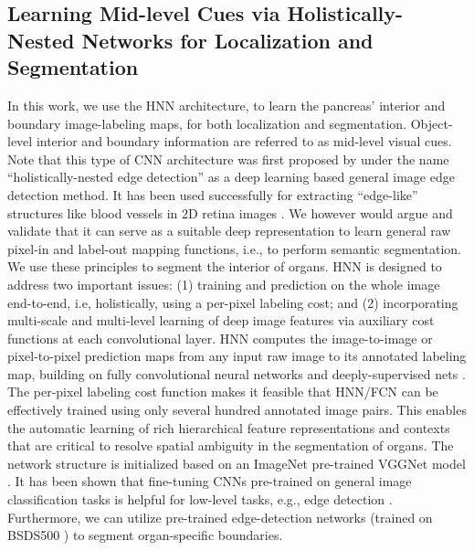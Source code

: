 \documentclass[journal]{IEEEtran}
\begin{document}
\subsection{Learning Mid-level Cues via Holistically-Nested Networks for Localization and Segmentation} \label{sec:segHNN} 
\noindent In this work, we use the HNN architecture, to learn the pancreas' interior and boundary image-labeling maps, for both localization and segmentation. Object-level interior and boundary information are referred to as mid-level visual cues. Note that this type of CNN architecture was first proposed by \cite{xie2015holistically} under the name ``holistically-nested edge detection'' as a deep learning based general image edge detection method. %
It has been used successfully for extracting ``edge-like'' structures like blood vessels in 2D retina images \cite{fu2016retinal}. We however would argue and validate that it can serve as a suitable deep representation to learn general raw pixel-in and label-out mapping functions, i.e., to perform semantic segmentation. We use these principles to segment the interior of organs. 
HNN is designed to address two important issues: (1) training and prediction on the whole image end-to-end, i.e, holistically, using a per-pixel labeling cost; and (2) incorporating multi-scale and multi-level learning of deep image features \cite{xie2015holistically} via auxiliary cost functions at each convolutional layer. HNN computes the image-to-image or pixel-to-pixel prediction maps from any input raw image to its annotated labeling map, building on fully convolutional neural networks \cite{long2015fully} and deeply-supervised nets \cite{lee2014deeply}. The per-pixel labeling cost function \cite{long2015fully,xie2015holistically} makes it feasible that HNN/FCN can be effectively trained using only several hundred annotated image pairs. This enables the automatic learning of rich hierarchical feature representations and contexts that are critical to resolve spatial ambiguity in the segmentation of organs. The network structure is initialized based on an ImageNet pre-trained VGGNet model \cite{simonyan2014very}. It has been shown that fine-tuning CNNs pre-trained on general image classification tasks is helpful for low-level tasks, e.g., edge detection \cite{xie2015holistically}. Furthermore, we can utilize pre-trained edge-detection networks (trained on BSDS500 \cite{xie2015holistically}) to segment organ-specific boundaries.
\end{document}
